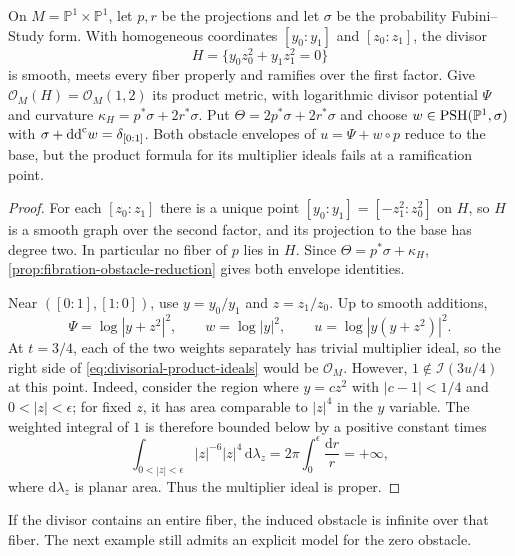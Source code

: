 \begin{example}\label{ex:ramified-divisor-ideal-factorization}
On $M=\mathbb P^1\times\mathbb P^1$, let $p,r$ be the projections and let $\sigma$ be the probability Fubini--Study form. With homogeneous coordinates $[y_0:y_1]$ and $[z_0:z_1]$, the divisor
\[
 H=\{y_0z_0^2+y_1z_1^2=0\}
\]
is smooth, meets every fiber properly and ramifies over the first factor. Give $\mathcal O_M(H)=\mathcal O_M(1,2)$ its product metric, with logarithmic divisor potential $\Psi$ and curvature $\kappa_H=p^*\sigma+2r^*\sigma$. Put $\Theta=2p^*\sigma+2r^*\sigma$ and choose $w\in\mathrm{PSH}(\mathbb P^1,\sigma)$ with $\sigma+\mathrm{dd}^{\mathrm{c}} w=\delta_{[0:1]}$. Both obstacle envelopes of $u=\Psi+w\circ p$ reduce to the base, but the product formula for its multiplier ideals fails at a ramification point.
\end{example}
\begin{proof}
For each $[z_0:z_1]$ there is a unique point $[y_0:y_1]=[-z_1^2:z_0^2]$ on $H$, so $H$ is a smooth graph over the second factor, and its projection to the base has degree two. In particular no fiber of $p$ lies in $H$. Since $\Theta=p^*\sigma+\kappa_H$, \cref{prop:fibration-obstacle-reduction} gives both envelope identities.

Near $([0:1],[1:0])$, use $y=y_0/y_1$ and $z=z_1/z_0$. Up to smooth additions,
\[
 \Psi=\log|y+z^2|^2,\qquad w=\log|y|^2,
 \qquad u=\log|y(y+z^2)|^2.
\]
At $t=3/4$, each of the two weights separately has trivial multiplier ideal, so the right side of \eqref{eq:divisorial-product-ideals} would be $\mathcal O_M$. However, $1\notin\mathcal I(3u/4)$ at this point. Indeed, consider the region where $y=cz^2$ with $|c-1|<1/4$ and $0<|z|<\epsilon$; for fixed $z$, it has area comparable to $|z|^4$ in the $y$ variable. The weighted integral of $1$ is therefore bounded below by a positive constant times
\[
 \int_{0<|z|<\epsilon}|z|^{-6}|z|^4\,\mathrm d\lambda_z
   =2\pi\int_0^\epsilon\frac{\mathrm dr}{r}=+\infty,
\]
where $\mathrm d\lambda_z$ is planar area. Thus the multiplier ideal is proper.
\end{proof}

If the divisor contains an entire fiber, the induced obstacle is infinite over that fiber. The next example still admits an explicit model for the zero obstacle.

